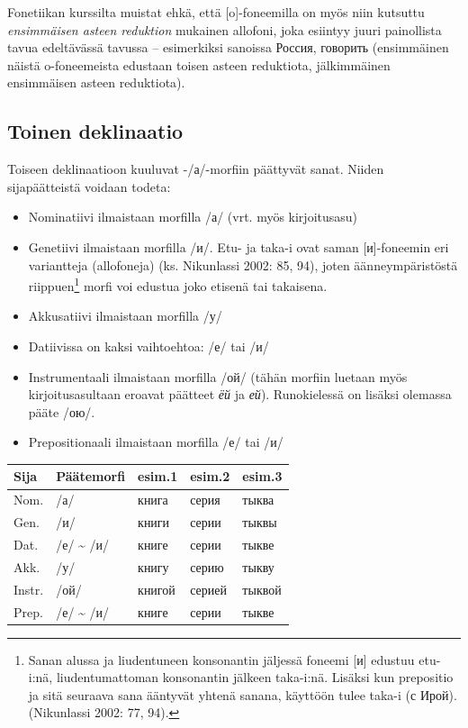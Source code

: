 \documentclass[]{scrreprt}
\providecommand{\tightlist}{%
  \setlength{\itemsep}{0pt}\setlength{\parskip}{0pt}}
\begin{document}
Fonetiikan kurssilta muistat ehkä, että {[}o{]}-foneemilla on myös niin
kutsuttu \emph{ensimmäisen asteen reduktion} mukainen allofoni, joka
esiintyy juuri painollista tavua edeltävässä tavussa -- esimerkiksi
sanoissa Россия, говорить (ensimmäinen näistä o-foneemeista edustaan
toisen asteen reduktiota, jälkimmäinen ensimmäisen asteen reduktiota).

\subsection{Toinen deklinaatio}\label{toinen-deklinaatio}

Toiseen deklinaatioon kuuluvat -/а/-morfiin päättyvät sanat. Niiden
sijapäätteistä voidaan todeta:

\begin{itemize}
\tightlist
\item
  Nominatiivi ilmaistaan morfilla /а/ (vrt. myös kirjoitusasu)
\item
  Genetiivi ilmaistaan morfilla /и/. Etu- ja taka-i ovat saman
  {[}и{]}-foneemin eri variantteja (allofoneja) (ks. Nikunlassi 2002:
  85, 94), joten äänneympäristöstä riippuen\footnote{Sanan alussa ja
    liudentuneen konsonantin jäljessä foneemi {[}и{]} edustuu etu-i:nä,
    liudentumattoman konsonantin jälkeen taka-i:nä. Lisäksi kun
    prepositio ja sitä seuraava sana ääntyvät yhtenä sanana, käyttöön
    tulee taka-i (с Ирой). (Nikunlassi 2002: 77, 94).} morfi voi edustua
  joko etisenä tai takaisena.
\item
  Akkusatiivi ilmaistaan morfilla /у/
\item
  Datiivissa on kaksi vaihtoehtoa: /е/ tai /и/
\item
  Instrumentaali ilmaistaan morfilla /ой/ (tähän morfiin luetaan myös
  kirjoitusasultaan eroavat päätteet \emph{ёй} ja \emph{ей}).
  Runokielessä on lisäksi olemassa pääte /ою/.
\item
  Prepositionaali ilmaistaan morfilla /е/ tai /и/
\end{itemize}

\begin{longtable}[c]{@{}lllll@{}}
\toprule
Sija & Päätemorfi & esim.1 & esim.2 & esim.3\tabularnewline
\midrule
\endhead
Nom. & /а/ & книга & серия & тыква\tabularnewline
Gen. & /и/ & книги & серии & тыквы\tabularnewline
Dat. & /е/ \textasciitilde{} /и/ & книге & серии & тыкве\tabularnewline
Akk. & /у/ & книгу & серию & тыкву\tabularnewline
Instr. & /ой/ & книгой & серией & тыквой\tabularnewline
Prep. & /е/ \textasciitilde{} /и/ & книге & серии & тыкве\tabularnewline
\bottomrule
\end{longtable}
\end{document}
